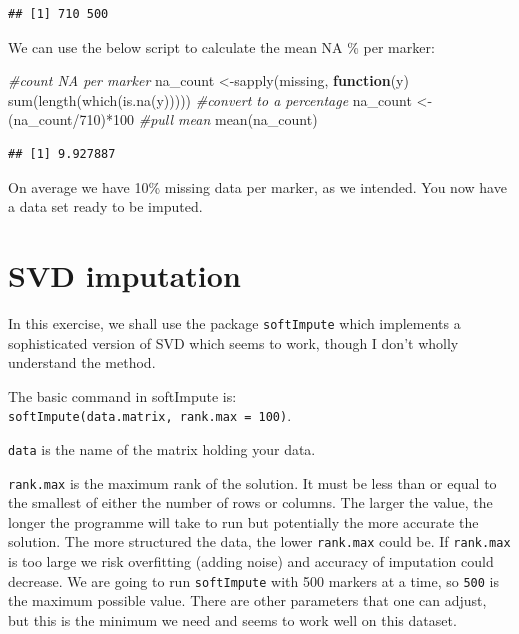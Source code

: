 \documentclass[
]{book}
\newenvironment{Shaded}{\begin{snugshade}}{\end{snugshade}}
\newcommand{\CommentTok}[1]{\textcolor[rgb]{0.56,0.35,0.01}{\textit{#1}}}
\newcommand{\ControlFlowTok}[1]{\textcolor[rgb]{0.13,0.29,0.53}{\textbf{#1}}}
\newcommand{\DecValTok}[1]{\textcolor[rgb]{0.00,0.00,0.81}{#1}}
\newcommand{\FunctionTok}[1]{\textcolor[rgb]{0.00,0.00,0.00}{#1}}
\newcommand{\NormalTok}[1]{#1}
\newcommand{\OtherTok}[1]{\textcolor[rgb]{0.56,0.35,0.01}{#1}}
\newcommand{\SpecialCharTok}[1]{\textcolor[rgb]{0.00,0.00,0.00}{#1}}
\begin{document}
\begin{verbatim}
## [1] 710 500
\end{verbatim}

We can use the below script to calculate the mean NA \% per marker:

\begin{Shaded}
\begin{Highlighting}[]
\CommentTok{\#count NA per marker}
\NormalTok{na\_count }\OtherTok{\textless{}{-}}\FunctionTok{sapply}\NormalTok{(missing, }\ControlFlowTok{function}\NormalTok{(y) }\FunctionTok{sum}\NormalTok{(}\FunctionTok{length}\NormalTok{(}\FunctionTok{which}\NormalTok{(}\FunctionTok{is.na}\NormalTok{(y)))))}
\CommentTok{\#convert to a percentage}
\NormalTok{na\_count }\OtherTok{\textless{}{-}}\NormalTok{(na\_count}\SpecialCharTok{/}\DecValTok{710}\NormalTok{)}\SpecialCharTok{*}\DecValTok{100}
\CommentTok{\#pull mean}
\FunctionTok{mean}\NormalTok{(na\_count)}
\end{Highlighting}
\end{Shaded}

\begin{verbatim}
## [1] 9.927887
\end{verbatim}

On average we have 10\% missing data per marker, as we intended. You now have a data set ready to be imputed.

\hypertarget{svd-imputation}{%
\section{SVD imputation}\label{svd-imputation}}

In this exercise, we shall use the package \texttt{softImpute} which implements a sophisticated version of SVD which seems to work, though I don't wholly understand the method.

The basic command in softImpute is: \texttt{softImpute(data.matrix,\ rank.max\ =\ 100)}.

\texttt{data} is the name of the matrix holding your data.

\texttt{rank.max} is the maximum rank of the solution. It must be less than or equal to the smallest of either the number of rows or columns. The larger the value, the longer the programme will take to run but potentially the more accurate the solution. The more structured the data, the lower \texttt{rank.max} could be. If \texttt{rank.max} is too large we risk overfitting (adding noise) and accuracy of imputation could decrease. We are going to run \texttt{softImpute} with 500 markers at a time, so \texttt{500} is the maximum possible value. There are other parameters that one can adjust, but this is the minimum we need and seems to work well on this dataset.
\end{document}
